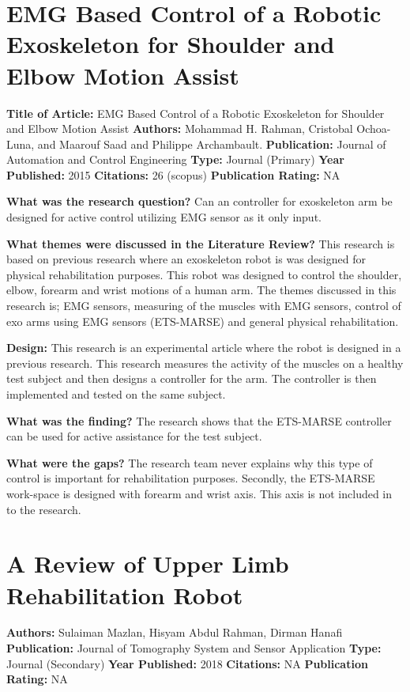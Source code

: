 \section{EMG Based Control of a Robotic Exoskeleton for Shoulder and Elbow Motion Assist} 
\textbf{Title of Article:} EMG Based Control of a Robotic Exoskeleton for Shoulder and Elbow Motion Assist \newline     
\textbf{Authors:} Mohammad H. Rahman, Cristobal Ochoa-Luna, and Maarouf Saad and Philippe Archambault.
\textbf{Publication:} Journal of Automation and Control Engineering
\textbf{Type:} Journal (Primary) \newline
\textbf{Year Published:} 2015
\textbf{Citations:} 26 (scopus)
 \textbf{Publication Rating:} NA

\textbf{What was the research question?} 
Can an controller for exoskeleton arm be designed for active control  utilizing EMG sensor as it only input. 

\textbf{What themes were discussed in the Literature Review?} 
This research is based on previous research where an exoskeleton robot is was designed for physical rehabilitation purposes. This robot was designed to control the shoulder, elbow, forearm and wrist motions of a human arm.  The themes discussed in this research is; EMG sensors, measuring of the muscles with EMG sensors, control of exo arms using EMG sensors (ETS-MARSE) and general physical rehabilitation.  

\textbf{Design:}  
This research is an experimental article where the robot is designed in a previous research. This research measures the activity of the muscles on a healthy test subject and then designs a controller for the arm. The controller is then implemented and tested on the same subject. 

\textbf{What was the finding?} 
The research shows that the ETS-MARSE controller can be used for active assistance for the test subject. 

\textbf{What were the gaps?}   
The research team never explains why this type of control is important for rehabilitation purposes. Secondly, the ETS-MARSE work-space is designed with forearm and wrist axis. This axis is not included in to the research. 

\section{A Review of Upper Limb Rehabilitation Robot} 
\textbf{Authors:} Sulaiman Mazlan, Hisyam Abdul Rahman, Dirman Hanafi \newline
\textbf{Publication:} Journal of Tomography System and Sensor Application
\textbf{Type:} Journal (Secondary) \newline
\textbf{Year Published:} 2018
\textbf{Citations:} NA \newline 
\textbf{Publication Rating:} NA 

